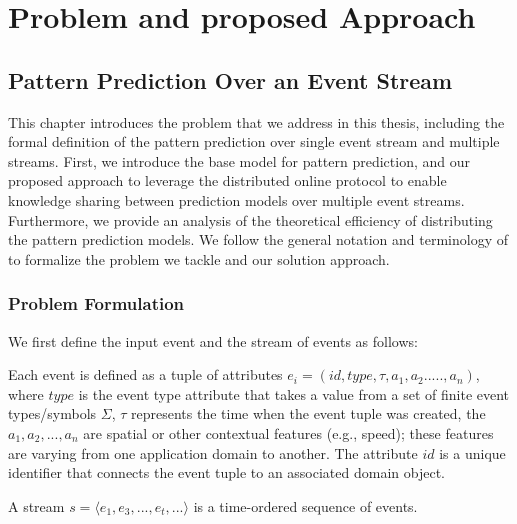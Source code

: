 \chapter{Problem and proposed Approach }
\label{chapter:system}
\section{Pattern Prediction Over an Event Stream}



This chapter introduces the problem that we address in this thesis, including the formal definition of the pattern prediction over single event stream and multiple streams. First, we introduce the base model for pattern prediction, and our proposed approach to leverage the distributed online protocol to enable knowledge sharing between prediction models over multiple event streams. Furthermore, we provide an analysis of the theoretical efficiency of distributing the pattern prediction models.
We follow the general notation and terminology of \cite{agrawal2008efficient,schultz2009distributed,luckham2008power,alevizos2015complex,zhou_pattern_2015,kamp2014communication} to formalize the problem we tackle and our solution approach.

\subsection{Problem Formulation}

We first define the input event and the stream of events as follows:  
\begin{definition}
	Each event is defined as a tuple of attributes $e_i = (id,type,\tau,a_1,a_2.....,a_n)$, where $type$ is the event type attribute that takes a value from a set of finite event types/symbols $\Sigma$, $\tau$ represents the time when the event tuple was created,  the  $a_1,a_2,...,a_n$ are spatial or other contextual features (e.g., speed); these features are varying from one application domain to another. The attribute $id$ is a unique identifier that connects the event tuple to an associated domain object.
\end{definition}

\begin{definition}
A stream $s=\langle e_1,e_3,...,e_t,...\rangle$  is a time-ordered sequence of events.
\end{definition}


